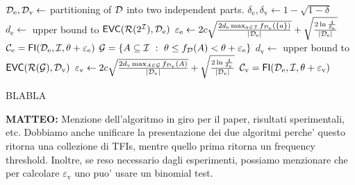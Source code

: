 \begin{algorithm}[htbp]
   \DontPrintSemicolon
  ${\cal D}_\mathrm{e},{\cal D}_\mathrm{v}\leftarrow$ partitioning of ${\cal D}$ into two independent parts.\;
  $\delta_\mathrm{e},\delta_\mathrm{v}\leftarrow 1-\sqrt{1-\delta}$ 
  $d_\mathrm{e}\leftarrow$ upper bound to $\mathsf{EVC}(\mathcal{R}(2^{\cal I}),{\cal D}_\mathrm{e})$  
	$\varepsilon_\mathrm{e}\leftarrow
	2c\sqrt{\frac{2d_\mathrm{e}\max_{a\in{\cal I}}f_{{\cal D}_\mathrm{e}}(\{a\})}{|{\cal D}_\mathrm{e}|}}
	+ \sqrt{\frac{2\ln\frac{4}{\delta_\mathrm{e}}}{|{\cal D}_\mathrm{e}|}}$\;
  $\mathcal{C}_\mathrm{e}=\mathsf{FI}({\cal D}_\mathrm{e},{\cal I},\theta+\varepsilon_\mathrm{e})$\;
  $\mathcal{G}=\{A\subseteq{\cal I} ~:~ \theta\le f_{\cal D}(A)<\theta+\varepsilon_\mathrm{e}\}$\;
  $d_\mathrm{v}\leftarrow$ upper bound to $\mathsf{EVC}(\mathcal{R}(\mathcal{G}),{\cal D}_\mathrm{v})$  
	$\varepsilon_\mathrm{v}\leftarrow
	2c\sqrt{\frac{2d_\mathrm{v}\max_{A\in\mathcal{G}}f_{{\cal D}_\mathrm{v}}(A)}{|{\cal D}_\mathrm{v}|}}
	+ \sqrt{\frac{2\ln\frac{4}{\delta_\mathrm{v}}}{|{\cal D}_\mathrm{v}|}}$\;
  $\mathcal{C}_\mathrm{v}=\mathsf{FI}({\cal D}_\mathrm{e},{\cal I},\theta+\varepsilon_\mathrm{v})$\;
  \caption{BLABLA}
  \label{alg:holdout}
\end{algorithm}

{\bf MATTEO:} Menzione dell'algoritmo in giro per il paper, risultati
sperimentali, etc. Dobbiamo anche unificare la presentazione dei due algoritmi
perche' questo ritorna una collezione di TFIs, mentre quello prima ritorna un
frequency threshold. Inoltre, se reso necessario dagli esperimenti, possiamo
menzionare che per calcolare $\varepsilon_\mathrm{v}$ uno puo' usare un binomial
test.
